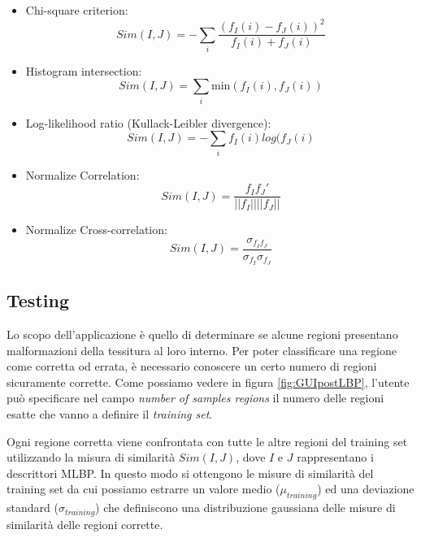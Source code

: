 \begin{itemize}

\item Chi-square criterion:
\begin{equation}
Sim(I, J) = -  \sum_{i} \frac{ (f_{I}(i) - f_{J}(i) )^2}{f_{I}(i) + f_{J}(i)}
\end{equation}

\item Histogram intersection:
\begin{equation}
Sim(I, J) = \sum_{i} \mbox{min}(f_{I}(i),f_{J}(i))
\end{equation}

\item Log-likelihood ratio (Kullack-Leibler 
divergence):
\begin{equation}
Sim(I, J) = - \sum_{i} f_{I}(i)log(f_{J}(i)
\end{equation}

\item Normalize Correlation:
\begin{equation}
Sim(I, J) = \frac{f_{I}f_{J}'}{||f_{I}|| ||f_{J}||}
\end{equation}

\item Normalize Cross-correlation:
\begin{equation}
Sim(I, J) = \frac{\sigma_{f_{I}f_{J}}}{\sigma_{f_{I}}\sigma_{f_{J}}}
\end{equation}


\end{itemize}

\pagebreak
\subsection{Testing}

Lo scopo dell'applicazione è quello di determinare se alcune regioni presentano malformazioni della tessitura al loro interno. Per poter classificare una regione come corretta od errata, è necessario conoscere un certo numero di regioni sicuramente corrette. Come possiamo vedere in figura \ref{fig:GUIpostLBP}, l'utente può specificare nel campo \textit{number of samples regions} il numero delle regioni esatte che vanno a definire il \textit{training set}.

Ogni regione corretta viene confrontata con tutte le altre regioni del training set utilizzando la misura di similarità $Sim(I, J)$, dove  $I$ e $J$ rappresentano i descrittori \acs{MLBP}.
In questo modo si ottengono le misure di similarità del training set da cui possiamo estrarre un valore medio ($\mu_{training}$) ed una deviazione standard ($\sigma_{training}$) che definiscono una distribuzione gaussiana delle misure di similarità delle regioni corrette.

